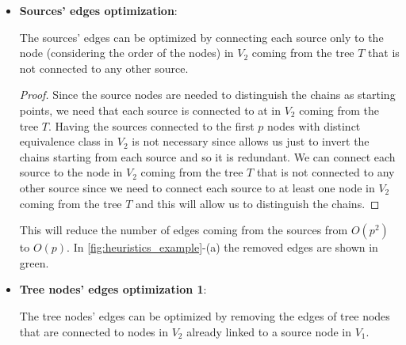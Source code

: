 \begin{itemize}
    \item \textbf{Sources' edges optimization}:
    \begin{lemma} \label{lemma:sources_optimization}
        The sources' edges can be optimized by connecting each source only to the   node (considering the order of the nodes) in $V_2$ coming from the tree $T$ that is not connected to any other source.
    \end{lemma}
    

    \begin{proof}
        Since the source nodes are needed to distinguish the chains as starting points, we need that each source is connected to at   in $V_2$ coming from the tree $T$. Having the sources connected to the first $p$ nodes with distinct equivalence class in $V_2$ is not necessary since allows us just to invert the chains starting from each source and so it is redundant. We can connect each source to the  node in $V_2$ coming from the tree $T$ that is not connected to any other source since we need to connect each source to at least one node in $V_2$ coming from the tree $T$ and this will allow us to distinguish the chains.
    \end{proof}

    This will reduce the number of edges coming from the sources from $O(p^2)$ to $O(p)$. In \cref{fig:heuristics_example}-(a) the removed edges are shown in green. 
    \item \textbf{Tree nodes' edges optimization 1}:
    \begin{lemma} \label{lemma:tree_optimization_1}
        The tree nodes' edges can be optimized by removing the edges of tree nodes that are connected to nodes in $V_2$ already linked to a source node in $V_1$.
    \end{lemma}


\end{itemize}
